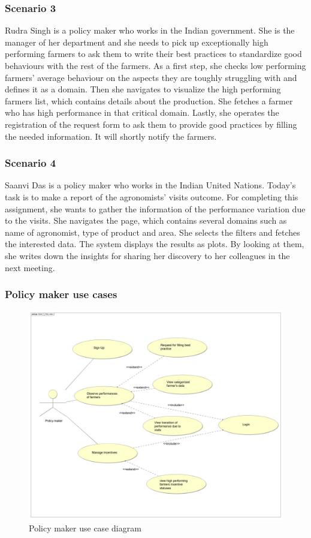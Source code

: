 \subsubsection*{Scenario 3}
Rudra Singh is a policy maker who works in the Indian government. She is the manager of her department and she needs to pick up exceptionally high performing farmers to ask them to write their best practices to standardize good behaviours with the rest of the farmers. As a first step, she checks low performing farmers' average behaviour on the aspects they are toughly struggling with and defines it as a domain. Then she navigates to visualize the high performing farmers list, which contains details about the production. She fetches a farmer who has high performance in that critical domain. Lastly, she operates the registration of the request form to ask them to provide good practices by filling the needed information. It will shortly notify the farmers. 
\subsubsection*{Scenario 4}
Saanvi Das is a policy maker who works in the Indian United Nations. Today's task is to make a report of the agronomists' visits outcome. For completing this assignment, she wants to gather the information of the performance variation due to the visits. She navigates the page, which contains several domains such as name of agronomist, type of product and area. She selects the filters and fetches the interested data. The system displays the results as plots. By looking at them, she writes down the insights for sharing her discovery to her colleagues in the next meeting.
\newpage


\subsubsection*{Policy maker use cases}
\begin{figure}[H]
	\centering
    \includegraphics[width=\textwidth]{Images/ud_policy.JPG}

	\caption{\label{fig:pm_use_case_diagram}Policy maker use case diagram}

\end{figure}
\label{sect:policy_maker_requirements}

